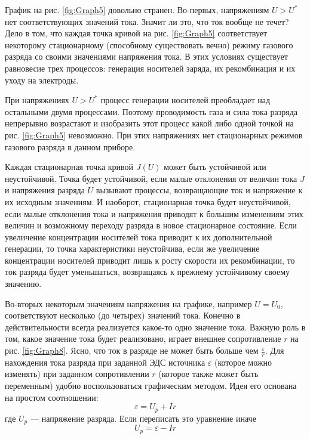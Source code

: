 \documentclass[a4paper, 12pt]{article}
\begin{document}
	График на рис. \ref{fig:Graph5} довольно странен. Во-первых, напряжениям $U>U^*$ нет соответствующих значений тока. Значит ли это, что ток вообще не течет? Дело в том, что каждая точка кривой на рис. \ref{fig:Graph5} соответствует некоторому стационарному (способному существовать вечно) режиму газового разряда со своими значениями напряжения тока. В этих условиях существует равновесие трех процессов: генерация носителей заряда, их рекомбинация и их уходу на электроды.\par
	При напряжениях $U>U^*$ процесс генерации носителей преобладает над остальными двумя процессами. Поэтому проводимость газа и сила тока разряда непрерывно возрастают и изобразить этот процесс какой либо одной точкой на рис. \ref{fig:Graph5} невозможно. При этих напряжениях нет стационарных режимов газового разряда в данном приборе.\par
	Каждая стационарная точка кривой $J\left(U\right)$ может быть устойчивой или неустойчивой. Точка будет устойчивой, если малые отклонения от величин тока $J$ и напряжения разряда $U$ вызывают процессы, возвращающие ток и напряжение к их исходным значениям. И наоборот, стационарная точка будет неустойчивой, если малые отклонения тока и напряжения приводят к большим изменениям этих величин и возможному переходу разряда в новое стационарное состояние. Если увеличение концентрации носителей тока приводит к их дополнительной генерации, то точка характеристики неустойчива, если же увеличение концентрации носителей приводит лишь к росту скорости их рекомбинации, то ток разряда будет уменьшаться, возвращаясь к прежнему устойчивому своему значению.\par
	Во-вторых некоторым значениям напряжения на графике, например $U=U_0$, соответствуют несколько (до четырех) значений тока. Конечно в действительности всегда реализуется какое-то одно значение тока. Важную роль в том, какое значение тока будет реализовано, играет внешнее сопротивление $r$ на рис. \ref{fig:Graph8}. Ясно, что ток в разряде не может быть больше чем $\frac{\varepsilon}{r}$. Для нахождения тока разряда при заданной ЭДС источника $\varepsilon$ (которое можно изменять) при заданном сопротивлении $r$ (которое также может быть переменным) удобно воспользоваться графическим методом. Идея его основана на простом соотношении:
	\begin{equation}
		\varepsilon=U_p+Ir
	\end{equation}
	где $U_p$ — напряжение разряда. Если переписать это уравнение иначе
	\begin{equation}
		U_p=\varepsilon-Ir
	\end{equation}
\end{document}
